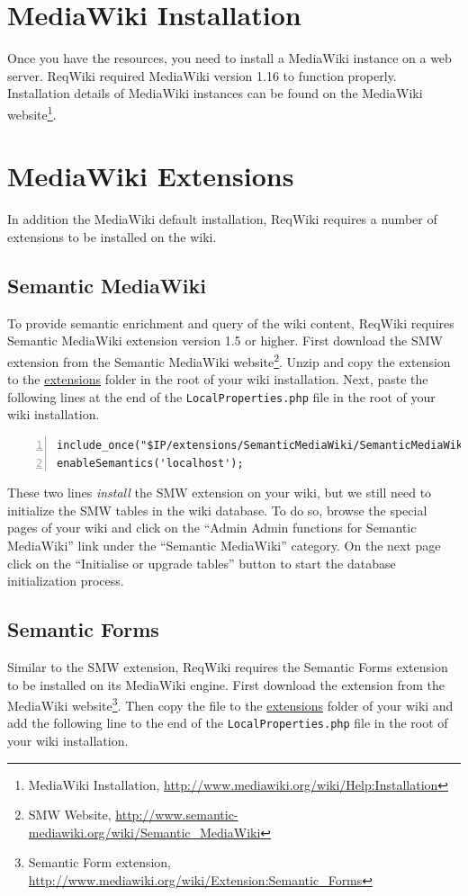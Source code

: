 \documentclass[10pt,twoside,openany,bibtotoc,liststotoc]{scrbook}
\begin{document}
\section{MediaWiki Installation}
Once you have the resources, you need to install a MediaWiki instance on a web server. ReqWiki required MediaWiki version 1.16 to function properly. Installation details of MediaWiki instances can be found on the MediaWiki website\footnote{MediaWiki Installation, \url{http://www.mediawiki.org/wiki/Help:Installation}}.

\section{MediaWiki Extensions}
In addition the MediaWiki default installation, ReqWiki requires a number of extensions to be installed on the wiki.

\subsection{Semantic MediaWiki}
To provide semantic enrichment and query of the wiki content, ReqWiki requires Semantic MediaWiki extension version 1.5 or higher. First download the SMW extension from the Semantic MediaWiki website\footnote{SMW Website, \url{http://www.semantic-mediawiki.org/wiki/Semantic\_MediaWiki}}. Unzip and copy the extension to the \url{extensions} folder in the root of your wiki installation. Next, paste the following lines at the end of the \texttt{LocalProperties.php} file in the root of your wiki installation.

\begin{center}
\begin{lstlisting}[language=xml,numbers=left,xleftmargin=4mm,columns=flexible]
include_once("$IP/extensions/SemanticMediaWiki/SemanticMediaWiki.php");
enableSemantics('localhost');
\end{lstlisting}
\end{center}

These two lines \emph{install} the SMW extension on your wiki, but we still need to initialize the SMW tables in the wiki database. To do so, browse the special pages of your wiki and click on the ``Admin Admin functions for Semantic MediaWiki'' link under the ``Semantic MediaWiki'' category. On the next page click on the ``Initialise or upgrade tables'' button to start the database initialization process.

\subsection{Semantic Forms}
Similar to the SMW extension, ReqWiki requires the Semantic Forms extension to be installed on its MediaWiki engine. First download the extension from the MediaWiki website\footnote{Semantic Form extension, \url{http://www.mediawiki.org/wiki/Extension:Semantic_Forms}}. Then copy the file to the \url{extensions} folder of your wiki and add the following line to the end of the \texttt{LocalProperties.php} file in the root of your wiki installation.
\end{document}
